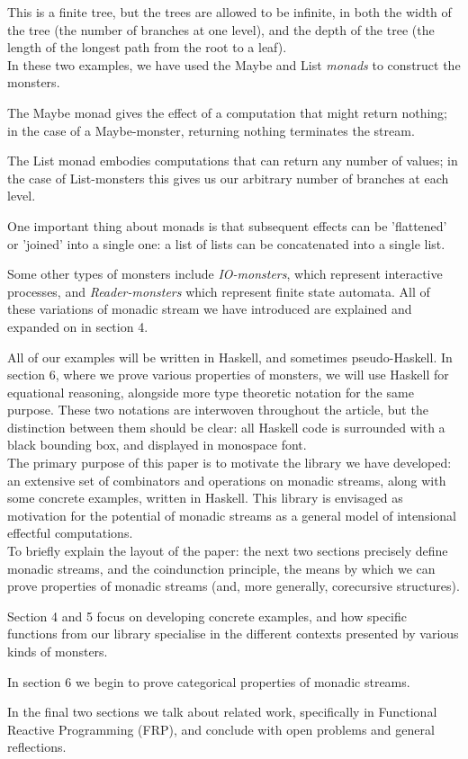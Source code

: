 This is a finite tree, but the trees are allowed to be infinite, in both the width of the tree (the number of branches at one level), and the depth of the tree (the length of the longest path from the root to a leaf). \\

In these two examples, we have used the Maybe and List \emph{monads} to construct the monsters. 

The Maybe monad gives the effect of a computation that might return nothing; in the case of a Maybe-monster, returning nothing terminates the stream. 

The List monad embodies computations that can return any number of values; in the case of List-monsters this gives us our arbitrary number of branches at each level.

One important thing about monads is that subsequent effects can be 'flattened' or 'joined' into a single one: a list of lists can be concatenated into a single list. 

Some other types of monsters include \emph{IO-monsters}, which represent interactive processes, and \emph{Reader-monsters} which represent finite state automata. All of these variations of monadic stream we have introduced are explained and expanded on in section 4.

All of our examples will be written in Haskell, and sometimes pseudo-Haskell. In section 6, where we prove various properties of monsters, we will use Haskell for equational reasoning, alongside more type theoretic notation for the same purpose. These two notations are interwoven throughout the article, but the distinction between them should be clear: all Haskell code is surrounded with a black bounding box, and displayed in monospace font. \\

The primary purpose of this paper is to motivate the library we have developed: an extensive set of combinators and operations on monadic streams, along with some concrete examples, written in Haskell. This library is envisaged as motivation for the potential of monadic streams as a general model of intensional effectful computations. \\

To briefly explain the layout of the paper: the next two sections precisely define monadic streams, and the coindunction principle, the means by which we can prove properties of monadic streams (and, more generally, corecursive structures).

Section 4 and 5 focus on developing concrete examples, and how specific functions from our library specialise in the different contexts presented by various kinds of monsters. 

In section 6 we begin to prove categorical properties of monadic streams. 

In the final two sections we talk about related work, specifically in Functional Reactive Programming (FRP), and conclude with open problems and general reflections.
